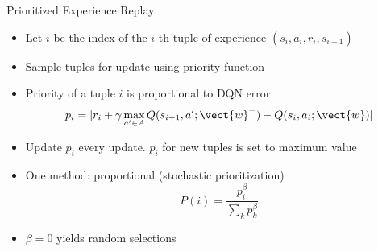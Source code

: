 \documentclass[aspectratio=169]{../latex_main/tntbeamer}  %
\begin{document}
\begin{frame}[c]{Prioritized Experience Replay~}
	
	\begin{itemize}
		\item Let $i$ be the index of the $i$-th tuple of experience $(s_i,a_i,r_i,s_{i+1})$
		\item Sample tuples for update using priority function
		\item Priority of a tuple $i$ is proportional to DQN error
		$$ p_i = | r_i + \gamma \max_{a' \in A} Q(s_{i+1}, a'; \vect{w}^-) - Q(s_i,a_i;\vect{w}) |$$
		\item Update $p_i$ every update. $p_i$ for new tuples is set to maximum value
		\item One method: proportional (stochastic prioritization)
		$$ P(i) = \frac{p_i^\beta}{\sum_k p_k^\beta}$$
		\item $\beta = 0$ yields random selections 
	\end{itemize}
	
\end{frame}
\end{document}

